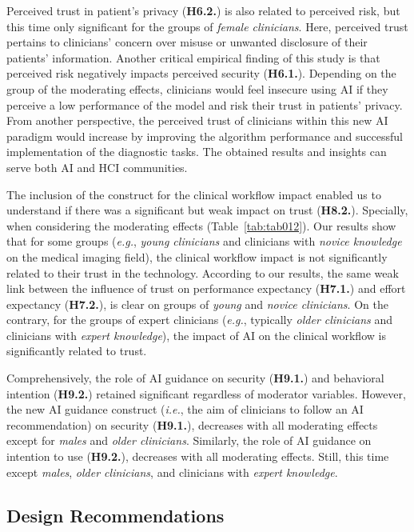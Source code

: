 Perceived trust in patient's privacy ({\bf H6.2.}) is also related to perceived risk, but this time only significant for the groups of {\it female clinicians}.
Here, perceived trust pertains to clinicians' concern over misuse or unwanted disclosure of their patients' information.
Another critical empirical finding of this study is that perceived risk negatively impacts perceived security ({\bf H6.1.}).
Depending on the group of the moderating effects, clinicians would feel insecure using AI if they perceive a low performance of the model and risk their trust in patients' privacy.
From another perspective, the perceived trust of clinicians within this new AI paradigm would increase by improving the algorithm performance and successful implementation of the diagnostic tasks.
The obtained results and insights can serve both AI and HCI communities.

The inclusion of the construct for the clinical workflow impact enabled us to understand if there was a significant but weak impact on trust ({\bf H8.2.}).
Specially, when considering the moderating effects (Table~\ref{tab:tab012}).
Our results show that for some groups ({\it e.g.}, {\it young clinicians} and clinicians with {\it novice knowledge} on the medical imaging field), the clinical workflow impact is not significantly related to their trust in the technology.
According to our results, the same weak link between the influence of trust on performance expectancy ({\bf H7.1.}) and effort expectancy ({\bf H7.2.}), is clear on groups of {\it young} and {\it novice clinicians}.
On the contrary, for the groups of expert clinicians ({\it e.g.}, typically {\it older clinicians} and clinicians with {\it expert knowledge}), the impact of AI on the clinical workflow is significantly related to trust.

Comprehensively, the role of AI guidance on security ({\bf H9.1.}) and behavioral intention ({\bf H9.2.}) retained significant regardless of moderator variables.
However, the new AI guidance construct ({\it i.e.}, the aim of clinicians to follow an AI recommendation) on security ({\bf H9.1.}), decreases with all moderating effects except for {\it males} and {\it older clinicians}.
Similarly, the role of AI guidance on intention to use ({\bf H9.2.}), decreases with all moderating effects. Still, this time except {\it males}, {\it older clinicians}, and clinicians with {\it expert knowledge}.

\subsection{Design Recommendations}
\label{sec:chap004006002}

